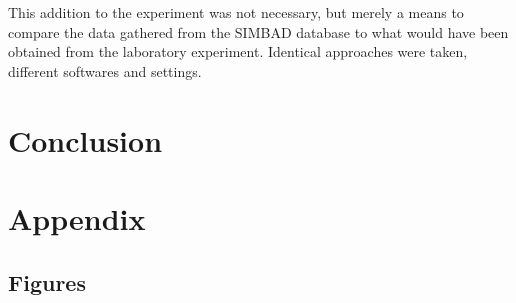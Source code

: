 \documentclass[12pt]{article}
\begin{document}
This addition to the experiment was not necessary, but merely a means to compare the data gathered from the SIMBAD database to what would have been obtained
from the laboratory experiment. Identical approaches were taken, different softwares and settings. 

\newpage

\section{Conclusion} \label{sec:4}



\newpage



 \label{sec:ref}

\vspace{1.5cm}

\listoffigures

\listoftables

\section*{Appendix} \label{sec:A}

\subsection*{Figures}
\end{document}
